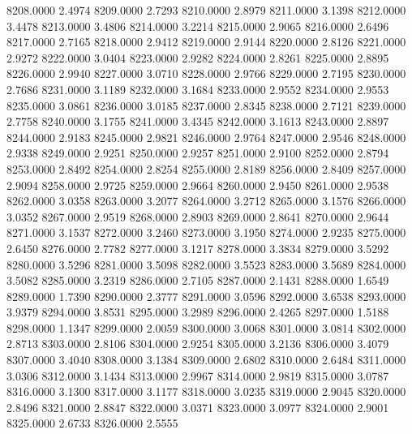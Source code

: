 8208.0000      2.4974
8209.0000      2.7293
8210.0000      2.8979
8211.0000      3.1398
8212.0000      3.4478
8213.0000      3.4806
8214.0000      3.2214
8215.0000      2.9065
8216.0000      2.6496
8217.0000      2.7165
8218.0000      2.9412
8219.0000      2.9144
8220.0000      2.8126
8221.0000      2.9272
8222.0000      3.0404
8223.0000      2.9282
8224.0000      2.8261
8225.0000      2.8895
8226.0000      2.9940
8227.0000      3.0710
8228.0000      2.9766
8229.0000      2.7195
8230.0000      2.7686
8231.0000      3.1189
8232.0000      3.1684
8233.0000      2.9552
8234.0000      2.9553
8235.0000      3.0861
8236.0000      3.0185
8237.0000      2.8345
8238.0000      2.7121
8239.0000      2.7758
8240.0000      3.1755
8241.0000      3.4345
8242.0000      3.1613
8243.0000      2.8897
8244.0000      2.9183
8245.0000      2.9821
8246.0000      2.9764
8247.0000      2.9546
8248.0000      2.9338
8249.0000      2.9251
8250.0000      2.9257
8251.0000      2.9100
8252.0000      2.8794
8253.0000      2.8492
8254.0000      2.8254
8255.0000      2.8189
8256.0000      2.8409
8257.0000      2.9094
8258.0000      2.9725
8259.0000      2.9664
8260.0000      2.9450
8261.0000      2.9538
8262.0000      3.0358
8263.0000      3.2077
8264.0000      3.2712
8265.0000      3.1576
8266.0000      3.0352
8267.0000      2.9519
8268.0000      2.8903
8269.0000      2.8641
8270.0000      2.9644
8271.0000      3.1537
8272.0000      3.2460
8273.0000      3.1950
8274.0000      2.9235
8275.0000      2.6450
8276.0000      2.7782
8277.0000      3.1217
8278.0000      3.3834
8279.0000      3.5292
8280.0000      3.5296
8281.0000      3.5098
8282.0000      3.5523
8283.0000      3.5689
8284.0000      3.5082
8285.0000      3.2319
8286.0000      2.7105
8287.0000      2.1431
8288.0000      1.6549
8289.0000      1.7390
8290.0000      2.3777
8291.0000      3.0596
8292.0000      3.6538
8293.0000      3.9379
8294.0000      3.8531
8295.0000      3.2989
8296.0000      2.4265
8297.0000      1.5188
8298.0000      1.1347
8299.0000      2.0059
8300.0000      3.0068
8301.0000      3.0814
8302.0000      2.8713
8303.0000      2.8106
8304.0000      2.9254
8305.0000      3.2136
8306.0000      3.4079
8307.0000      3.4040
8308.0000      3.1384
8309.0000      2.6802
8310.0000      2.6484
8311.0000      3.0306
8312.0000      3.1434
8313.0000      2.9967
8314.0000      2.9819
8315.0000      3.0787
8316.0000      3.1300
8317.0000      3.1177
8318.0000      3.0235
8319.0000      2.9045
8320.0000      2.8496
8321.0000      2.8847
8322.0000      3.0371
8323.0000      3.0977
8324.0000      2.9001
8325.0000      2.6733
8326.0000      2.5555
